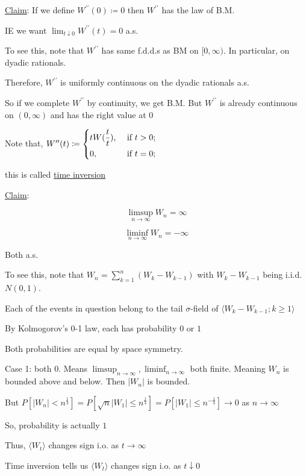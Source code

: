 \documentclass{article}
\theoremstyle{definition}
\begin{document}
\underline{Claim}: If we define \(W^{\prime\prime} (0) \coloneqq 0\) then \(W^{\prime\prime}\) has the law of B.M.

IE we want \(\lim_{t \downarrow 0} W^{\prime\prime} (t) = 0\) a.s.

To see this, note that \(W^{\prime\prime}\) has same f.d.d.s as BM on \([0,\infty)\). In particular, on dyadic rationals.

Therefore, \(W^{\prime\prime}\) is uniformly continuous on the dyadic rationals a.s.

So if we complete \(W^{\prime\prime}\) by continuity, we get B.M. But \(W^{\prime\prime}\) is already continuous on \((0,\infty)\) and has the right value at \(0\) 

Note that, \(W^{\prime\prime} (t) \coloneqq \begin{dcases}
    t W(\frac{t}{t}), &\text{ if } t > 0 ;\\
    0, &\text{ if } t = 0 ;
\end{dcases}\) 

this is called \underline{time inversion} 

\underline{Claim}:

\[
    \limsup_{n \to \infty} W_n = \infty
\]

\[
    \liminf_{n \to \infty} W_n = -\infty
\]

Both a.s.

To see this, note that \(W_n = \sum_{k=1}^n (W_k - W_{k-1}) \) with \(W_k - W_{k-1}\) being i.i.d.\ \(N(0,1)\).

Each of the events in question belong to the tail \(\sigma\)-field of \(\langle W_k - W_{k-1} ; k \geq 1 \rangle \) 

By Kolmogorov's 0-1 law, each has probability \(0\) or \(1\) 

Both probabilities are equal by space symmetry.

Case 1: both \(0\). Means \(\limsup_{n \to \infty}, \liminf_{n \to \infty} \) both finite. Meaning \(W_n\) is bounded above and below. Then \(\vert W_n \vert\) is bounded.

But \(P[\vert W_n \vert < n^{\frac{1}{4}}] = P[\sqrt{n} \vert W_1 \vert \leq n^{\frac{1}{4}}] = P[\vert W_1 \vert \leq n^{-\frac{1}{4}}] \to 0\) as \(n \to \infty\) 

So, probability is actually \(1\) 

Thus, \(\langle W_t \rangle\) changes sign i.o. as \(t \to \infty\)  

Time inversion tells us \(\langle W_t \rangle\) changes sign i.o. as \(t \downarrow 0\) 
\end{document}
